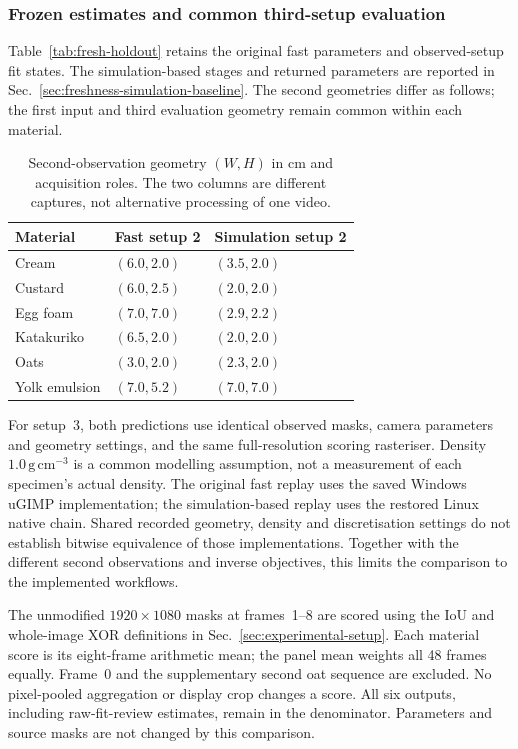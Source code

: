 \subsubsection{Frozen estimates and common third-setup evaluation}
Table~\ref{tab:fresh-holdout} retains the original fast parameters and
observed-setup fit states. The simulation-based stages and returned
parameters are reported in Sec.~\ref{sec:freshness-simulation-baseline}.
The second geometries differ as follows; the first input and third
evaluation geometry remain common within each material.

\begin{table}[!htbp]
\centering\small
\caption{Second-observation geometry $(W,H)$ in cm and acquisition roles. The two columns are different captures, not alternative
processing of one video.}
\label{tab:fresh-second-geometries}
\begin{tabular}{@{}lll@{}}
\toprule
Material & Fast setup 2 & Simulation setup 2 \\
\midrule
Cream & $(6.0,2.0)$ & $(3.5,2.0)$ \\
Custard & $(6.0,2.5)$ & $(2.0,2.0)$ \\
Egg foam & $(7.0,7.0)$ & $(2.9,2.2)$ \\
Katakuriko & $(6.5,2.0)$ & $(2.0,2.0)$ \\
Oats & $(3.0,2.0)$ & $(2.3,2.0)$ \\
Yolk emulsion & $(7.0,5.2)$ & $(7.0,7.0)$ \\
\bottomrule
\end{tabular}
\end{table}

For setup~3, both predictions use identical observed masks, camera
parameters and geometry settings, and the same full-resolution scoring
rasteriser. Density $1.0\,\mathrm{g\,cm}^{-3}$ is a common modelling
assumption, not a measurement of each specimen's actual density.
The original fast replay uses the saved Windows uGIMP
implementation; the simulation-based replay uses the restored Linux
native chain. Shared recorded geometry, density and discretisation
settings do not establish bitwise equivalence of those implementations.
Together with the different second observations and inverse objectives,
this limits the comparison to the implemented workflows.

The unmodified $1920\times1080$ masks at frames~1--8 are scored using
the IoU and whole-image XOR definitions in
Sec.~\ref{sec:experimental-setup}. Each material score is its
eight-frame arithmetic mean; the panel mean weights all 48 frames
equally. Frame~0 and the supplementary second oat sequence are
excluded. No pixel-pooled aggregation or display crop changes a score.
All six outputs, including raw-fit-review estimates, remain in the
denominator. Parameters and source masks are not changed by this
comparison.

